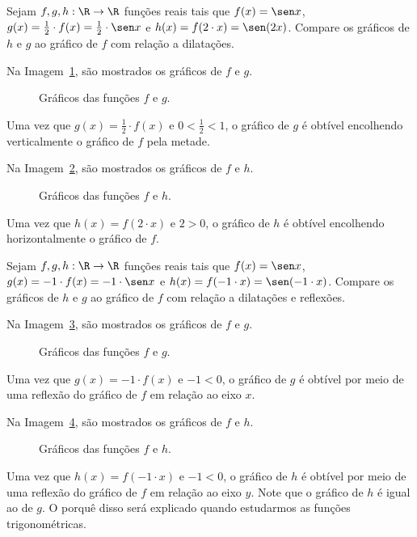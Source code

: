 \begin{example}
  Sejam $f, g , h: \R \to \R$ funções reais tais que $f(x) = \sen x$, $g(x) = \frac 1 2 \cdot f(x)  = \frac 1 2 \cdot \sen x $ e $h(x)= f(2 \cdot x)= \sen (2x)$.
  Compare os gráficos de $h$ e $g$ ao gráfico de $f$ com relação a dilatações.
\end{example}

\begin{solution}
Na Imagem~\ref{img:dilatacao-exemplo1-g}, são mostrados os gráficos de $f$ e $g$.
%
  \begin{figure}
    \centering
    \caption{Gráficos das funções $f$ e $g$.}
    \label{img:dilatacao-exemplo1-g}
  \end{figure}
\noindent Uma vez que $g(x) = \frac 1 2 \cdot f(x)$ e $0 < \frac 1 2 < 1$, o gráfico de $g$ é obtível encolhendo verticalmente o gráfico de $f$ pela metade.

Na Imagem~\ref{img:dilatacao-exemplo1-h}, são mostrados os gráficos de $f$ e $h$.
%
  \begin{figure}
    \centering
    \caption{Gráficos das funções $f$ e $h$.}
    \label{img:dilatacao-exemplo1-h}
  \end{figure}
\noindent Uma vez que $h(x) = f(2 \cdot x)$ e $2>0$, o gráfico de $h$ é obtível encolhendo horizontalmente o gráfico de $f$.
\end{solution}

\begin{example}
Sejam $f, g , h: \R \to \R$ funções reais tais que $f(x) = \sen x$, $g(x) = -1 \cdot f(x)  = -1 \cdot \sen x $ e $h(x)= f(-1 \cdot x)= \sen (-1 \cdot x)$.
Compare os gráficos de $h$ e $g$ ao gráfico de $f$ com relação a dilatações e reflexões.
\end{example}

\begin{solution}
Na Imagem~\ref{img:dilatacao-exemplo2-g}, são mostrados os gráficos de $f$ e $g$.
%
  \begin{figure}
    \centering
    \caption{Gráficos das funções $f$ e $g$.}
    \label{img:dilatacao-exemplo2-g}
  \end{figure}
%
\noindent Uma vez que $g(x) = -1 \cdot f(x)$ e $-1 < 0$, o gráfico de $g$ é obtível por meio de uma reflexão do gráfico de $f$ em relação ao eixo $x$.

Na Imagem~\ref{img:dilatacao-exemplo2-h}, são mostrados os gráficos de $f$ e $h$.
%
  \begin{figure}
    \centering
    \caption{Gráficos das funções $f$ e $h$.}
    \label{img:dilatacao-exemplo2-h}
  \end{figure}
\noindent Uma vez que $h(x)= f(-1 \cdot x)$ e $-1 < 0$, o gráfico de $h$ é obtível por meio de uma reflexão do gráfico de $f$ em relação ao eixo $y$.
Note que o gráfico de $h$ é igual ao de $g$. 
O porquê disso será explicado quando estudarmos as funções trigonométricas.
\end{solution}

